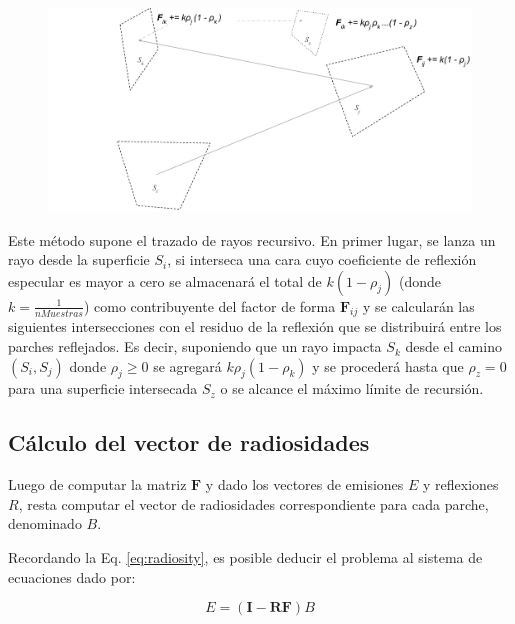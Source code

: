 \vspace{5mm}
\begin{figure}[htbp!]
	\includegraphics[width=1\linewidth]{assets/extended}
	\label{img:caminoespecular}
\end{figure}

Este método supone el trazado de rayos recursivo. En primer lugar, se lanza un rayo desde la superficie $S_{i}$, si  interseca una cara cuyo coeficiente de reflexión especular es mayor a cero se almacenará el total de $k(1 - \rho_{j})$ (donde $k = \frac{1}{nMuestras}$) como contribuyente del factor de forma $\mathbf{F}_{ij}$ y se calcularán las siguientes intersecciones con el residuo de la reflexión que se distribuirá entre los parches reflejados. Es decir, suponiendo que un rayo impacta $S_{k}$ desde el camino $(S_{i}, S_{j})$ donde $\rho_{j} \ge 0$ se agregará $k\rho_{j}(1 - \rho_{k})$ y se procederá hasta que $\rho_{z} = 0$ para una superficie intersecada $S_{z}$ o se alcance el máximo límite de recursión.

\subsection{Cálculo del vector de radiosidades}
\label{sec:vrad}

Luego de computar la matriz $\mathbf{F}$ y dado los vectores de emisiones $E$ y reflexiones $R$, resta computar el vector de radiosidades correspondiente para cada parche, denominado $B$.

Recordando la Eq. \eqref{eq:radiosity}, es posible deducir el problema al sistema de ecuaciones dado por:

\begin{equation}
	E = (\mathbf{I} - \mathbf{RF})B
\end{equation}

